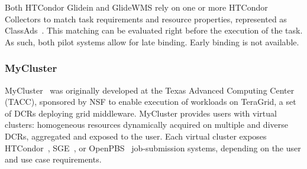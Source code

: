 \documentclass{sig-alternate}
\begin{document}

Both HTCondor Glidein and GlideWMS rely on one or more HTCondor Collectors to
match task requirements and resource properties, represented as
ClassAds~\cite{classad_url}. This matching can be evaluated right before the
execution of the task. As such, both pilot systems allow for late binding. Early
binding is not available.


%
\subsubsection{MyCluster}\label{sec:mycluster}

MyCluster~\cite{walker2007personal,mycluster_url} was originally developed at
the Texas Advanced Computing Center (TACC), sponsored by NSF to enable execution
of workloads on TeraGrid, a set of DCRs deploying grid middleware. MyCluster
provides users with virtual clusters: homogeneous resources dynamically acquired
on multiple and diverse DCRs, aggregated and exposed to the user. Each virtual
cluster exposes HTCondor~\cite{thain2005}, SGE~\cite{chase2003dynamic}, or
OpenPBS~\cite{openpbs_url} job-submission systems, depending on the user and use
case requirements.
\end{document}
